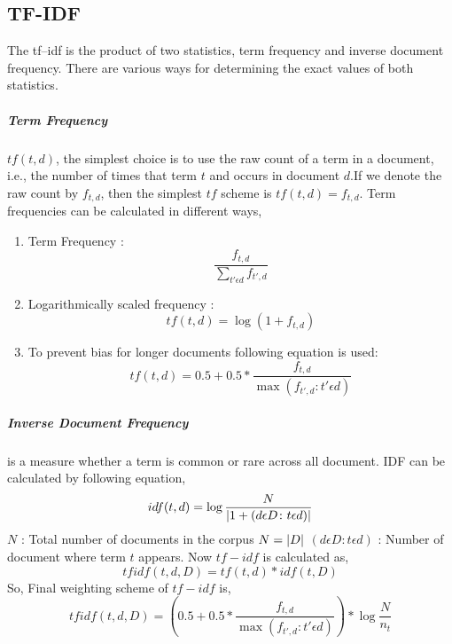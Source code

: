 \subsection{TF-IDF}
The tf–idf is the product of two statistics\cite{zhang2011comparative}, term frequency and inverse document frequency. There are various ways for determining the exact values of both statistics.

\subparagraph{Term Frequency}$tf(t,d)$, the simplest choice is to use the raw count of a term in a document, i.e., the number of times that term $t$ and occurs in document $d$.If we denote the raw count by $f_{t,d}$, then the simplest $tf$ scheme is $tf(t,d) = f_{t,d}$. Term frequencies can be calculated in  different ways,
\begin{enumerate}
    \item Term Frequency : 
    \begin{equation}
        \dfrac{f_{t,d}}{\sum_{t'\epsilon d}^{}f_{t',d}}
    \end{equation}
    \item Logarithmically scaled frequency :
    \begin{equation}
         tf(t,d)=\log(1+f_{t,d})
    \end{equation}
   
    \item To prevent bias for longer documents following equation is used:
    \begin{equation}
        tf(t,d) = 0.5 + 0.5 * \frac{f_{t,d}}{\max{(f_{t',d}\colon t'\epsilon d)}}
    \end{equation}
\end{enumerate}

\subparagraph{Inverse Document Frequency}
is a measure whether a term is common or rare across all document. IDF can be calculated by following equation,
\begin{equation}
    idf(t,d) = \log \frac{N}{\lvert1+(d\epsilon D\colon t\epsilon d)\rvert}
\end{equation}
\noindent
$N$ : Total number of documents in the corpus $N = \lvert D\rvert$\newline
$(d \epsilon D\colon t\epsilon d)$ : \textrm{Number of document where term $t$ appears.}\newline
\vspace{0.5cm}
Now $tf-idf$ is calculated as,
\begin{equation}
    tfidf(t, d, D) = tf(t, d)*idf(t, D)
\end{equation}
So, Final weighting scheme of $tf-idf$ is,
\begin{equation}
        tfidf(t, d, D)=(0.5 + 0.5 * \frac{f_{t,d}}{\max{(f_{t',d}\colon t'\epsilon d)}})*\log \frac{N}{n_t}
\end{equation}
\clearpage

